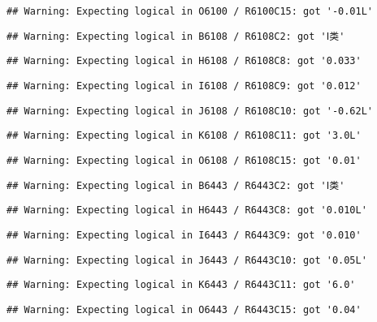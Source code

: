 \documentclass[
]{article}
\begin{document}
\begin{verbatim}
## Warning: Expecting logical in O6100 / R6100C15: got '-0.01L'
\end{verbatim}

\begin{verbatim}
## Warning: Expecting logical in B6108 / R6108C2: got 'Ⅰ类'
\end{verbatim}

\begin{verbatim}
## Warning: Expecting logical in H6108 / R6108C8: got '0.033'
\end{verbatim}

\begin{verbatim}
## Warning: Expecting logical in I6108 / R6108C9: got '0.012'
\end{verbatim}

\begin{verbatim}
## Warning: Expecting logical in J6108 / R6108C10: got '-0.62L'
\end{verbatim}

\begin{verbatim}
## Warning: Expecting logical in K6108 / R6108C11: got '3.0L'
\end{verbatim}

\begin{verbatim}
## Warning: Expecting logical in O6108 / R6108C15: got '0.01'
\end{verbatim}

\begin{verbatim}
## Warning: Expecting logical in B6443 / R6443C2: got 'Ⅰ类'
\end{verbatim}

\begin{verbatim}
## Warning: Expecting logical in H6443 / R6443C8: got '0.010L'
\end{verbatim}

\begin{verbatim}
## Warning: Expecting logical in I6443 / R6443C9: got '0.010'
\end{verbatim}

\begin{verbatim}
## Warning: Expecting logical in J6443 / R6443C10: got '0.05L'
\end{verbatim}

\begin{verbatim}
## Warning: Expecting logical in K6443 / R6443C11: got '6.0'
\end{verbatim}

\begin{verbatim}
## Warning: Expecting logical in O6443 / R6443C15: got '0.04'
\end{verbatim}
\end{document}
